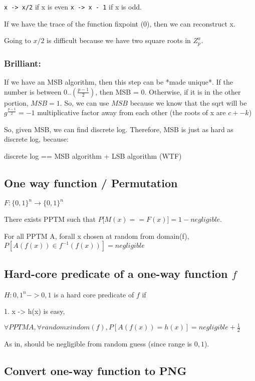 \texttt{x -> x/2} if x is even
\texttt{x -> x - 1} if x is odd.

If we have the trace of the function fixpoint (0), then we can reconstruct x.

Going to $x/2$ is difficult because we have two square roots in $Z_p^x$.

\subsubsection{Brilliant: }
If we have an MSB algorithm, then this step can be *made unique*.
If the number is between $0..(\frac{p-1}{2})$, then MSB = 0. Otherwise,
if it is in the other portion, $MSB = 1$. So, we can use $MSB$ because
we know that the sqrt will be $g^\frac{p - 1}{2} = -1$ multiplicative
factor away from each other (the roots of x are $c+-k$)

So, given MSB, we can find discrete log.
Therefore, MSB is just as hard as discrete log, because:

discrete log == MSB algorithm + LSB algorithm (WTF)


\subsection{One way function / Permutation}

$F: \{0, 1\}^n \to \{0, 1\}^n$

There exists PPTM such that $P \lbrack M(x) == F(x) \rbrack = 1 - negligible$.


For all PPTM A, forall x chosen at random from domain(f), 
$P[A(f(x)) \in f^{-1}(f(x))] = negligible$

\subsection{Hard-core predicate of a one-way function $f$}

$H:{0, 1}^n -> {0, 1}$ is a hard core predicate of $f$ if 

1. x -> h(x) is easy,


$\forall PPTM A, \forall random x in dom(f), P[A(f(x)) = h(x)] = negligible + \frac{1}{2}$

As in, should be negligible from random guess (since range is ${0, 1}$).



\subsection{Convert one-way function to PNG}

